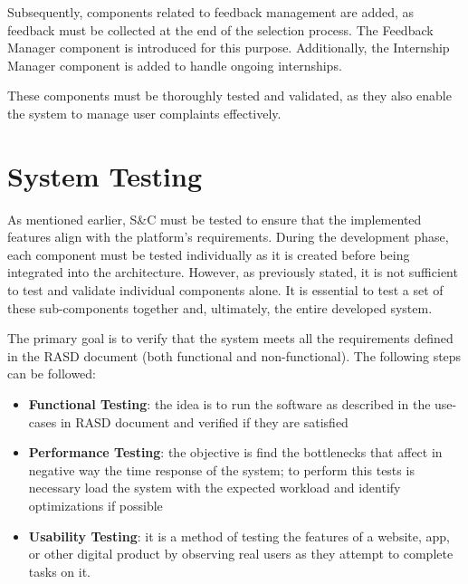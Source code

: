 Subsequently, components related to feedback management are added, as feedback must be collected at the end of the selection process. The Feedback Manager component is introduced for this purpose. Additionally, the Internship Manager component is added to handle ongoing internships.

These components must be thoroughly tested and validated, as they also enable the system to manage user complaints effectively.


\section{System Testing}
As mentioned earlier, S\&C must be tested to ensure that the implemented features align with the platform's requirements. During the development phase, each component must be tested individually as it is created before being integrated into the architecture. However, as previously stated, it is not sufficient to test and validate individual components alone. It is essential to test a set of these sub-components together and, ultimately, the entire developed system.

The primary goal is to verify that the system meets all the requirements defined in the RASD document (both functional and non-functional). The following steps can be followed:

\begin{itemize}
	\item \textbf{Functional Testing}: the idea is to run the software as described in the use-cases in RASD document and verified if they are satisfied
	\item \textbf{Performance Testing}: the objective is find the bottlenecks that affect in negative way the time response of the system; to perform this tests is necessary load the system with the expected workload and identify optimizations if possible
	\item \textbf{Usability Testing}: it is a method of testing the features of a website, app, or other digital product by observing real users as they attempt to complete tasks on it.
\end{itemize}


